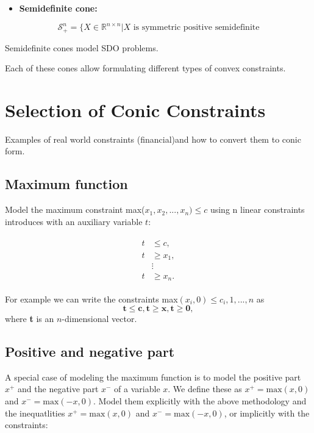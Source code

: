 \documentclass{article}
\begin{document}
\begin{itemize}
\item{\textbf{Semidefinite cone:}}
\end{itemize}

$$\mathcal{S}^n_+=\{X \in \mathbb{R}^{n\times n}| X\text{ is symmetric positive semidefinite}$$

Semidefinite cones model SDO problems.

Each of these cones allow formulating different types of convex constraints.

\section{Selection of Conic Constraints}

Examples of real world constraints (financial)and how to convert them to conic form.

\subsection{Maximum function}

Model the maximum constraint max($x_1, x_2, ... , x_n)\leq c$ using n linear constraints introduces with an auxiliary variable $t$:

\begin{align}
  \begin{split}
    t &\leq c, \\
    t &\geq x_1, \\
    &\vdots \\
    t &\geq x_n.
  \end{split}
\end{align}

For example we can write the constraints max$(x_i,0)\leq c_i, 1,...,n$ as
$$\mathbf{t} \leq \mathbf{c}, \mathbf{t}\geq \mathbf{x}, \mathbf{t}\geq \mathbf{0},$$
where \textbf{t} is an $n$-dimensional vector.

\subsection{Positive and negative part}

A special case of modeling the maximum function is to model the positive part $x^+$ and the negative part $x^-$ of a variable $x$.
We define these as $x^+=\text{max}(x,0)$ and $x^-=\text{max}(-x,0)$. Model them explicitly with the above methodology and
the inequatlities $x^+=\text{max}(x,0)$ and $x^-=\text{max}(-x,0)$, or implicitly with the constraints:
\end{document}
